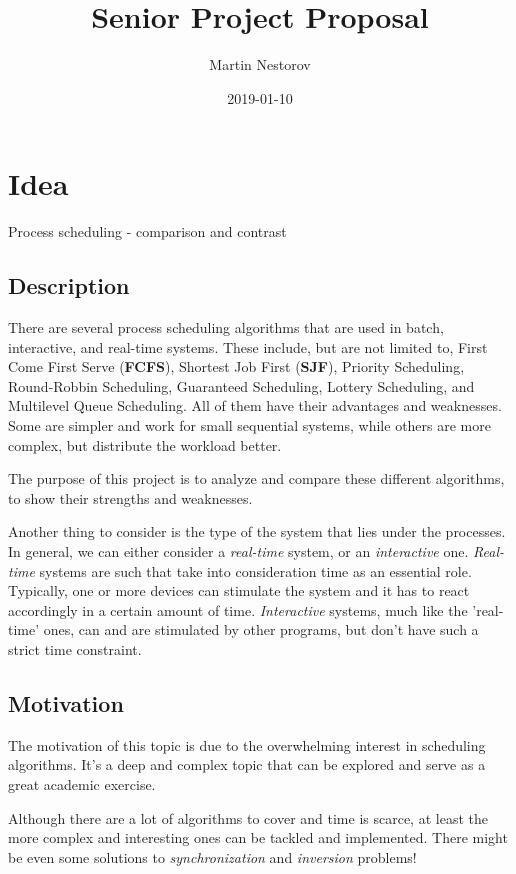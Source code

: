 \documentclass{article}
\title{Senior Project Proposal}
\date{2019-01-10}
\author{Martin Nestorov}
\begin{document}
\maketitle
{}

\section*{Idea}

Process scheduling - comparison and contrast

\subsection*{Description}

There are several process scheduling algorithms that are used in batch, interactive, and real-time systems. These include, but are not limited to, First Come First Serve (\textbf{FCFS}), Shortest Job First (\textbf{SJF}), Priority Scheduling, Round-Robbin Scheduling, Guaranteed Scheduling, Lottery Scheduling, and Multilevel Queue Scheduling. All of them have their advantages and weaknesses. Some are simpler and work for small sequential systems, while others are more complex, but distribute the workload better.

The purpose of this project is to analyze and compare these different algorithms, to show their strengths and weaknesses.

Another thing to consider is the type of the system that lies under the processes. In general, we can either consider a \textit{real-time} system, or an \textit{interactive} one. \textit{Real-time} systems are such that take into consideration time as an essential role. Typically, one or more devices can stimulate the system and it has to react accordingly in a certain amount of time. \textit{Interactive} systems, much like the 'real-time' ones, can and are stimulated by other programs, but don't have such a strict time constraint.

\subsection*{Motivation}

The motivation of this topic is due to the overwhelming interest in scheduling algorithms. It's a deep and complex topic that can be explored and serve as a great academic exercise.

Although there are a lot of algorithms to cover and time is scarce, at least the more complex and interesting ones can be tackled and implemented. There might be even some solutions to \textit{synchronization} and \textit{inversion} problems!
\end{document}
